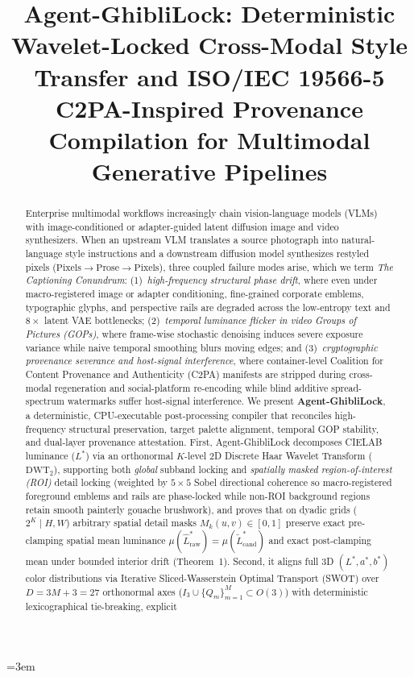 \documentclass[conference,10pt]{IEEEtran}
\begin{document}
\emergencystretch=3em

\title{Agent-GhibliLock: Deterministic Wavelet-Locked Cross-Modal Style Transfer and ISO/IEC 19566-5 C2PA-Inspired Provenance Compilation for Multimodal Generative Pipelines}

\author{
}

\maketitle

\begin{abstract}
Enterprise multimodal workflows increasingly chain vision-language models (VLMs) with image-conditioned or adapter-guided latent diffusion image and video synthesizers. When an upstream VLM translates a source photograph into natural-language style instructions and a downstream diffusion model synthesizes restyled pixels ($\text{Pixels} \to \text{Prose} \to \text{Pixels}$), three coupled failure modes arise, which we term \emph{The Captioning Conundrum}: (1)~\emph{high-frequency structural phase drift}, where even under macro-registered image or adapter conditioning, fine-grained corporate emblems, typographic glyphs, and perspective rails are degraded across the low-entropy text and $8\times$ latent VAE bottlenecks; (2)~\emph{temporal luminance flicker in video Groups of Pictures (GOPs)}, where frame-wise stochastic denoising induces severe exposure variance while naive temporal smoothing blurs moving edges; and (3)~\emph{cryptographic provenance severance and host-signal interference}, where container-level Coalition for Content Provenance and Authenticity (C2PA) manifests are stripped during cross-modal regeneration and social-platform re-encoding while blind additive spread-spectrum watermarks suffer host-signal interference. We present \textbf{Agent-GhibliLock}, a deterministic, CPU-executable post-processing compiler that reconciles high-frequency structural preservation, target palette alignment, temporal GOP stability, and dual-layer provenance attestation. First, Agent-GhibliLock decomposes CIELAB luminance ($L^*$) via an orthonormal $K$-level 2D Discrete Haar Wavelet Transform ($\mathrm{DWT}_2$), supporting both \emph{global} subband locking and \emph{spatially masked region-of-interest (ROI)} detail locking (weighted by $5\times 5$ Sobel directional coherence so macro-registered foreground emblems and rails are phase-locked while non-ROI background regions retain smooth painterly gouache brushwork), and proves that on dyadic grids ($2^K \mid H,W$) arbitrary spatial detail masks $M_k(u,v) \in [0,1]$ preserve exact pre-clamping spatial mean luminance $\mu(\widehat{L}^*_{\text{raw}}) = \mu(\widetilde{L}^*_{\text{cand}})$ and exact post-clamping mean under bounded interior drift (Theorem~1). Second, it aligns full 3D $(L^*, a^*, b^*)$ color distributions via Iterative Sliced-Wasserstein Optimal Transport (SWOT) over $D = 3M+3 = 27$ orthonormal axes ($I_3 \cup \{Q_m\}_{m=1}^M \subset O(3)$) with deterministic lexicographical tie-breaking, explicit 
\end{abstract}
\end{document}
